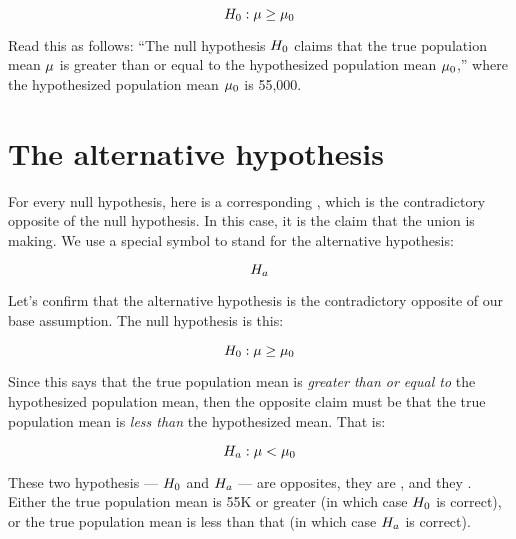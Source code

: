 \documentclass[../../../main.tex]{subfiles}
\begin{document}
\begin{equation*}
  \NullHyp/: \populationmean \geq \HypPopMean/
\end{equation*}

\noindent
Read this as follows: ``The null hypothesis $\NullHyp/$ claims that the true population mean $\mu$ is greater than or equal to the hypothesized population mean $\HypPopMean/$,'' where the hypothesized population mean $\HypPopMean/$ is 55,000.


\section{The alternative hypothesis}

For every null hypothesis, here is a corresponding , which is the contradictory opposite of the null hypothesis. In this case, it is the claim that the union is making. We use a special symbol to stand for the alternative hypothesis:

\begin{equation*}
  \AltHyp/
\end{equation*}

\noindent
Let's confirm that the alternative hypothesis is the contradictory opposite of our base assumption. The null hypothesis is this:

\begin{equation*}
  \NullHyp/: \populationmean \geq \HypPopMean/
\end{equation*}

\noindent
Since this says that the true population mean is \emph{greater than or equal to} the hypothesized population mean, then the opposite claim must be that the true population mean is \emph{less than} the hypothesized mean. That is:

\begin{equation*}
  \AltHyp/: \populationmean < \HypPopMean/
\end{equation*}

\noindent
These two hypothesis --- $\NullHyp/$ and $\AltHyp/$ --- are opposites, they are , and they . Either the true population mean is 55K or greater (in which case $\NullHyp/$ is correct), or the true population mean is less than that (in which case $\AltHyp/$ is correct).


\end{document}
